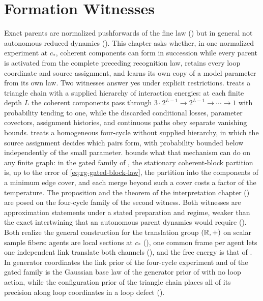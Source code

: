 \chapter{Formation Witnesses}
\label{ch:finite-depth-formation}

Exact parents are normalized pushforwards of the fine law
() but in general not autonomous reduced
dynamics (). This chapter asks whether, in one
normalized experiment at \(c_*\), coherent components can form in succession
while every parent is activated from the complete preceding recognition law,
retains every loop coordinate and source assignment, and learns its own copy
of a model parameter from its own law. Two witnesses answer yes under
explicit restrictions.  treats a
triangle chain with a supplied hierarchy of interaction energies: at each
finite depth \(L\) the coherent components pass through
\(3\cdot2^{L-1}\to2^{L-1}\to\cdots\to1\) with probability tending to one,
while the discarded conditional losses, parameter covectors, assignment
histories, and continuous paths obey separate vanishing bounds.
 treats a homogeneous four-cycle
without supplied hierarchy, in which the source assignment decides which
pairs form, with probability bounded below independently of the small
parameter.  bounds what that mechanism can do
on any finite graph: in the gated family of
, the stationary coherent-block
partition is, up to the error of \cref{eq:rg-gated-block-law}, the
partition into the components of a minimum edge cover, and each merge
beyond such a cover costs a factor of the temperature. The proposition and
the theorem of
the interpretation
chapter ()
are posed on the four-cycle family of the second witness. Both witnesses are
approximation statements under a stated preparation and regime, weaker than
the exact intertwining that an autonomous parent dynamics would require
(). Both realize the general
construction for the translation group \((\mathbb R,+)\) on scalar sample fibers:
agents are local sections at \(c_*\) (), one common frame
per agent lets one independent link translate both channels
(), and the free energy is that of
. In generator coordinates the link prior of the four-cycle experiment and
of the gated family is the Gaussian base law of the generator prior of  with no loop
action, while the configuration prior of the triangle chain places all of its precision along loop
coordinates in a loop defect ().

